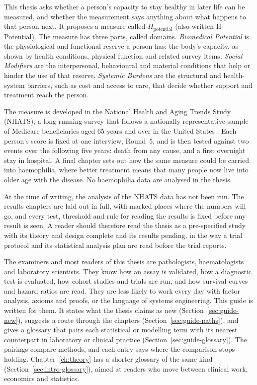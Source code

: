 \label{ch:guide}

This thesis asks whether a person's capacity to stay healthy in later life can
be measured, and whether the measurement says anything about what happens to
that person next. It proposes a measure called $H_{\text{potential}}$ (also
written H-Potential). The measure has three parts, called domains.
\emph{Biomedical Potential} is the physiological and functional reserve a
person has: the body's capacity, as shown by health conditions, physical
function and related survey items. \emph{Social Modifiers} are the
interpersonal, behavioural and material conditions that help or hinder the use
of that reserve. \emph{Systemic Burdens} are the structural and health-system
barriers, such as cost and access to care, that decide whether support and
treatment reach the person.

The measure is developed in the National Health and Aging Trends Study
(NHATS), a long-running survey that follows a nationally representative sample
of Medicare beneficiaries aged 65 years and over in the United States
\citep{kasper_2021}. Each person's score is fixed at one interview, Round~5,
and is then tested against two events over the following five years: death
from any cause, and a first overnight stay in hospital. A final chapter sets
out how the same measure could be carried into haemophilia, where better
treatment means that many people now live into older age with the disease.
No haemophilia data are analysed in the thesis.

At the time of writing, the analysis of the NHATS data has not been run. The
results chapters are laid out in full, with marked places where the numbers
will go, and every test, threshold and rule for reading the results is fixed
before any result is seen. A reader should therefore read the thesis as a
pre-specified study with its theory and design complete and its results
pending, in the way a trial protocol and its statistical analysis plan are
read before the trial reports.

The examiners and most readers of this thesis are pathologists, haematologists
and laboratory scientists. They know how an assay is validated, how a
diagnostic test is evaluated, how cohort studies and trials are run, and how
survival curves and hazard ratios are read. They are less likely to work every
day with factor analysis, axioms and proofs, or the language of systems
engineering. This guide is written for them. It states what the thesis claims
as new (Section~\ref{sec:guide-new}), suggests a route through the chapters
(Section~\ref{sec:guide-paths}), and gives a glossary that pairs each
statistical or modelling term with its nearest counterpart in laboratory or
clinical practice (Section~\ref{sec:guide-glossary}). The pairings compare
methods, and each entry says where the comparison stops holding.
Chapter~\ref{ch:theory} has a shorter glossary of the same kind
(Section~\ref{sec:intro-glossary}), aimed at readers who move between clinical
work, economics and statistics.

